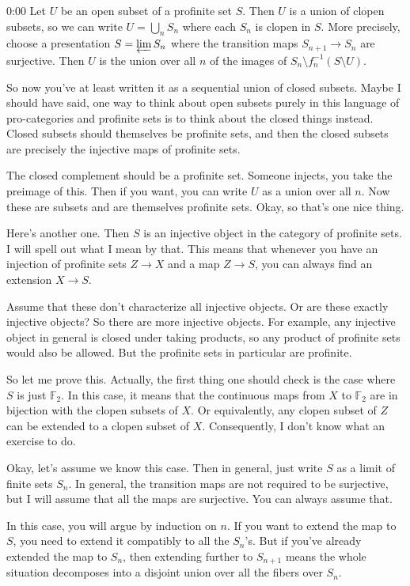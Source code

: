 \begin{unfinished}{0:00}
Let $U$ be an open subset of a profinite set $S$. Then $U$ is a union of clopen subsets, so we can write $U = \bigcup_{n} S_n$ where each $S_n$ is clopen in $S$. More precisely, choose a presentation $S = \varprojlim S_n$ where the transition maps $S_{n+1} \to S_n$ are surjective. Then $U$ is the union over all $n$ of the images of $S_n \setminus f_n^{-1}(S \setminus U)$.

So now you've at least written it as a sequential union of closed subsets. Maybe I should have said, one way to think about open subsets purely in this language of pro-categories and profinite sets is to think about the closed things instead. Closed subsets should themselves be profinite sets, and then the closed subsets are precisely the injective maps of profinite sets.

The closed complement should be a profinite set. Someone injects, you take the preimage of this. Then if you want, you can write $U$ as a union over all $n$. Now these are subsets and are themselves profinite sets. Okay, so that's one nice thing.

Here's another one. Then $S$ is an injective object in the category of profinite sets. I will spell out what I mean by that. This means that whenever you have an injection of profinite sets $Z \to X$ and a map $Z \to S$, you can always find an extension $X \to S$.

Assume that these don't characterize all injective objects. Or are these exactly injective objects? So there are more injective objects. For example, any injective object in general is closed under taking products, so any product of profinite sets would also be allowed. But the profinite sets in particular are profinite.

So let me prove this. Actually, the first thing one should check is the case where $S$ is just $\mathbb{F}_2$. In this case, it means that the continuous maps from $X$ to $\mathbb{F}_2$ are in bijection with the clopen subsets of $X$. Or equivalently, any clopen subset of $Z$ can be extended to a clopen subset of $X$. Consequently, I don't know what an exercise to do.

Okay, let's assume we know this case. Then in general, just write $S$ as a limit of finite sets $S_n$. In general, the transition maps are not required to be surjective, but I will assume that all the maps are surjective. You can always assume that.

In this case, you will argue by induction on $n$. If you want to extend the map to $S$, you need to extend it compatibly to all the $S_n$'s. But if you've already extended the map to $S_n$, then extending further to $S_{n+1}$ means the whole situation decomposes into a disjoint union over all the fibers over $S_n$.


\end{unfinished}
